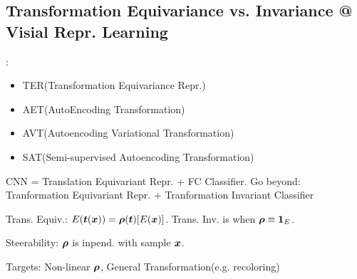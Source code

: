 \documentclass{article}
\begin{document}
\subsection{Transformation Equivariance vs. Invariance @ Visial Repr. Learning}
    :
    \begin{itemize}
        \item TER(Transformation Equivariance Repr.)
        \item AET(AutoEncoding Transformation)
        \item AVT(Autoencoding Variational Transformation)
        \item SAT(Semi-supervised Autoencoding Transformation)
    \end{itemize}

    CNN = Translation Equivariant Repr. + FC Classifier. Go beyond: Tranformation Equivariant Repr. + Tranformation Invariant Classifier

    Trans. Equiv.: $E(\boldsymbol{t}(\boldsymbol{x}))=\boldsymbol{\rho}(\boldsymbol{t})[E(\boldsymbol{x})]$. Trans. Inv. is when $\boldsymbol{\rho} \equiv \boldsymbol{1}_E$.

    Steerability: $\boldsymbol{\rho}$ is inpend. with sample $\boldsymbol{x}$.

    Targets: Non-linear $\boldsymbol{\rho}$, General Transformation(e.g. recoloring)

    
\end{document}
